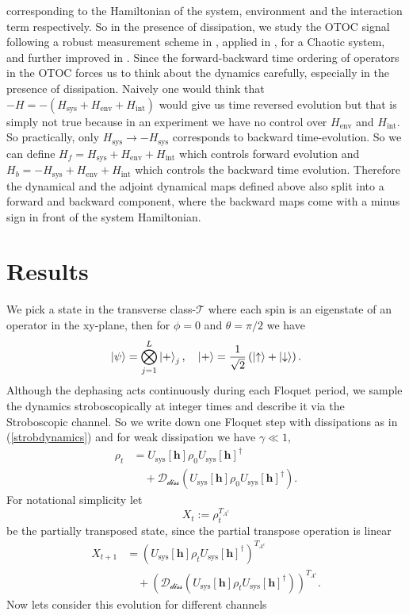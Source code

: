 \documentclass[aps,pra,reprint,amsmath,amssymb]{revtex4-2}
\newcommand{\hsys}[0]{H_{\text{sys}}}
\newcommand{\henv}[0]{H_{\text{env}}}
\newcommand{\hint}[0]{H_{\text{int}}}
\newcommand{\Usys}[0]{U_{\text{sys}}[\bm{h}]}
\begin{document}
corresponding to the Hamiltonian of the system, environment and the interaction term respectively. So in the presence of dissipation, we study the OTOC signal following a robust measurement scheme in \cite{swingle2016measuring}, applied in \cite{zhang2019information}, for a Chaotic system, and further improved in \cite{swingle2018resilience}. Since the forward-backward time ordering of operators in the OTOC forces us to think about the dynamics carefully, especially in the presence of dissipation. Naively one would think that $-H=-(\hsys+\henv+\hint)$ would give us time reversed evolution but that is simply not true because in an experiment we have no control over $\henv$ and $\hint$. So practically, only $\hsys \rightarrow -\hsys$ corresponds to backward time-evolution. So we can define $H_f=\hsys + \henv + \hint$ which controls forward evolution and $H_b = -\hsys +\henv +\hint$ which controls the backward time evolution. Therefore the dynamical and the adjoint dynamical maps defined above also split into a forward and backward component, where the backward maps come with a minus sign in front of the system Hamiltonian.
\section{Results}
We pick a state in the transverse class-$\mathcal{T}$ where each spin is an eigenstate of an operator in the xy-plane, then for $\phi=0$ and $\theta=\pi/2$ we have 
\begin{align}
    \ket{\psi}=\bigotimes_{j=1}^L \ket{+}_j,\quad\ket{+}=\frac{1}{\sqrt{2}}\left(\ket{\uparrow}+\ket{\downarrow}\right).
\end{align}
Although the dephasing acts continuously during each Floquet period, we sample the dynamics stroboscopically at integer times and describe it via the Stroboscopic channel. So we write down one Floquet step with dissipations as in (\ref{strobdynamics}) and
for weak dissipation we have $\gamma\ll1$, 
\begin{align}
    \rho_{t}&= \Usys \rho_0\Usys^\dagger \nonumber\\
    &\quad+ \mathcal{D_{\text{diss}}}\left(\Usys \rho_0\Usys^\dagger\right).
\end{align}
For notational simplicity let $$X_t:=\rho_t^{T_{A^c}}$$ be the partially transposed state, since the partial transpose operation is linear
\begin{align}
\label{parttranspo}
    X_{t+1}&= \left(\Usys \rho_t\Usys^\dagger\right)^{T_{A^c}} \nonumber\\&\quad+ \left(\mathcal{D_{\text{diss}}}\left(\Usys \rho_t\Usys^\dagger\right)\right)^{T_{A^c}}.
\end{align}
Now lets consider this evolution for different channels
\end{document}
